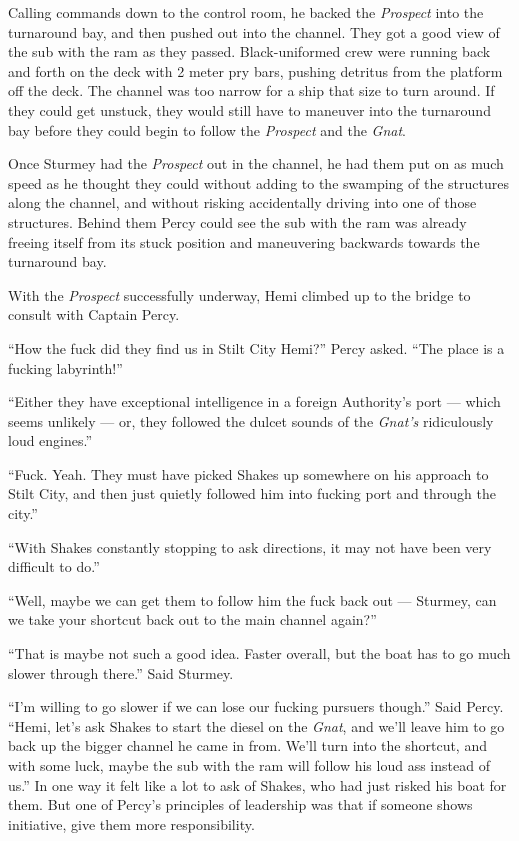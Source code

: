 \documentclass[
]{scrbook}
\begin{document}
Calling commands down to the control room, he backed the \emph{Prospect}
into the turnaround bay, and then pushed out into the channel. They got
a good view of the sub with the ram as they passed. Black-uniformed crew
were running back and forth on the deck with 2 meter pry bars, pushing
detritus from the platform off the deck. The channel was too narrow for
a ship that size to turn around. If they could get unstuck, they would
still have to maneuver into the turnaround bay before they could begin
to follow the \emph{Prospect} and the \emph{Gnat}.

Once Sturmey had the \emph{Prospect} out in the channel, he had them put
on as much speed as he thought they could without adding to the swamping
of the structures along the channel, and without risking accidentally
driving into one of those structures. Behind them Percy could see the
sub with the ram was already freeing itself from its stuck position and
maneuvering backwards towards the turnaround bay.

With the \emph{Prospect} successfully underway, Hemi climbed up to the
bridge to consult with Captain Percy.

``How the fuck did they find us in Stilt City Hemi?'' Percy asked. ``The
place is a fucking labyrinth!''

``Either they have exceptional intelligence in a foreign Authority's
port --- which seems unlikely --- or, they followed the dulcet sounds of
the \emph{Gnat's} ridiculously loud engines.''

``Fuck. Yeah. They must have picked Shakes up somewhere on his approach
to Stilt City, and then just quietly followed him into fucking port and
through the city.''

``With Shakes constantly stopping to ask directions, it may not have
been very difficult to do.''

``Well, maybe we can get them to follow him the fuck back out ---
Sturmey, can we take your shortcut back out to the main channel again?''

``That is maybe not such a good idea. Faster overall, but the boat has
to go much slower through there.'' Said Sturmey.

``I'm willing to go slower if we can lose our fucking pursuers though.''
Said Percy. ``Hemi, let's ask Shakes to start the diesel on the
\emph{Gnat}, and we'll leave him to go back up the bigger channel he
came in from. We'll turn into the shortcut, and with some luck, maybe
the sub with the ram will follow his loud ass instead of us.'' In one
way it felt like a lot to ask of Shakes, who had just risked his boat
for them. But one of Percy's principles of leadership was that if
someone shows initiative, give them more responsibility.
\end{document}
